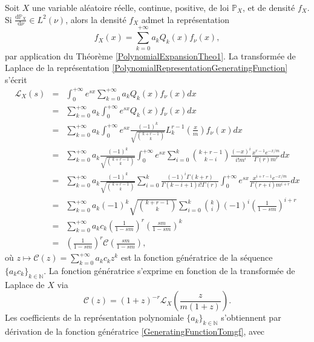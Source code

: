 Soit $X$ une variable aléatoire réelle, continue, positive, de loi $\mathbb{P}_{X}$, et de densité $f_{X}$. Si $\frac{\text{d}\mathbb{P}_{X}}{\text{d}\nu}\in L^{2}(\nu)$, alors la densité $f_{X}$ admet la représentation 
\begin{equation}\label{PolynomialRepresentationGeneratingFunction}
f_{X}(x)=\sum_{k=0}^{+\infty}a_{k}Q_{k}(x)f_{\nu}(x),
\end{equation}
par application du Théorème \ref{PolynomialExpansionTheo1}. La transformée de Laplace de la représentation \eqref{PolynomialRepresentationGeneratingFunction} s\rq{}écrit
\begin{eqnarray}
\mathcal{L}_{X}(s)&=&\int_{0}^{+\infty}e^{sx}\sum_{k=0}^{+\infty}a_{k}Q_{k}(x)f_{\nu}(x)dx\nonumber\\
&=&\sum_{k=0}^{+\infty}a_{k}\int_{0}^{+\infty}e^{sx}Q_{k}(x)f_{\nu}(x)dx \nonumber\\
&=&\sum_{k=0}^{+\infty}a_{k}\int_{0}^{+\infty}e^{sx}\frac{(-1)^{k}}{\sqrt{\binom{k+r-1}{k}}}L_{k}^{r-1}\left(\frac{x}{m}\right)f_{\nu}(x)dx\nonumber\\
&=&\sum_{k=0}^{+\infty}a_{k}\frac{(-1)^{k}}{\sqrt{\binom{k+r-1}{k}}}\int_{0}^{+\infty}e^{sx}\sum_{i=0}^{k}\binom{k+r-1}{k-i}\frac{(-x)^{i}}{i!m^{i}}\frac{x^{r-1}e^{-x/m}}{\Gamma(r)m^{r}}dx \nonumber\\
&=&\sum_{k=0}^{+\infty}a_{k}\frac{(-1)^{k}}{\sqrt{\binom{k+r-1}{k}}}\sum_{i=0}^{k}\frac{(-1)^{i}\Gamma(k+r)}{\Gamma(k-i+1)i!\Gamma(r)}\int_{0}^{+\infty}e^{sx}\frac{x^{i+r-1}e^{-x/m}}{\Gamma(r+i)m^{i+r}}dx\nonumber\\
&=&\sum_{k=0}^{+\infty}a_{k}(-1)^{k}\sqrt{\binom{k+r-1}{k}}\sum_{i=0}^{k}\binom{k}{i}(-1)^{i}\left(\frac{1}{1-sm}\right)^{i+r}\nonumber\\
&=&\sum_{k=0}^{+\infty}a_{k}c_{k}\left(\frac{1}{1-sm}\right)^{r}\left(\frac{sm}{1-sm}\right)^{k}\nonumber\\
&=&\left(\frac{1}{1-sm}\right)^{r}\mathcal{C}\left(\frac{sm}{1-sm}\right)\label{mgfToGeneratingFunction},
\end{eqnarray}
où $z\mapsto\mathcal{C}\left(z\right)=\sum_{k=0}^{+\infty}a_{k}c_{k}z^{k}$ est la fonction génératrice de la séquence $\{a_{k}c_{k}\}_{k\in\mathbb{N}}$. La fonction génératrice s\rq{}exprime en fonction de la transformée de Laplace de $X$ via 
\begin{equation}\label{GeneratingFunctionTomgf}
\mathcal{C}\left(z\right) =(1+z)^{-r}\mathcal{L}_{X}\left(\frac{z}{m(1+z)}\right).
\end{equation}
Les coefficients de la représentation polynomiale $\{a_{k}\}_{k\in\mathbb{N}}$ s\rq{}obtiennent par dérivation de la fonction génératrice \eqref{GeneratingFunctionTomgf}, avec
